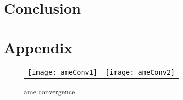 \section{Conclusion}


\newpage
\section{Appendix}

\begin{figure}[ht]
	\centering
	\begin{tabular}{cc}
	\texttt{[image: ameConv1]} &
	\texttt{[image: ameConv2]}
	\end{tabular}
	\caption{ame convergence}
	\label{fig:ameConv}
\end{figure}









